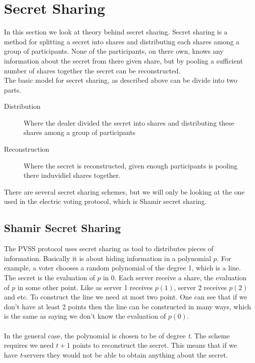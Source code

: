 \section{Secret Sharing}
In this section we look at theory behind secret sharing. Secret sharing is a method for splitting a secret into shares and distributing each shares among a group of participants. None of the participants, on there own, knows any information about the secret from there given share, but by pooling a sufficient number of shares together the secret can be reconstructed. \\

\noindent
The basic model for secret sharing, as described above can be divide into two parts. 

\begin{description}
    \item[Distribution] Where the dealer divided the secret into shares and distributing these shares among a group of participants 
    \item[Reconstruction] Where the secret is reconstructed, given enough participants is pooling there induvidiel shares together. 
\end{description}

\noindent
There are several secret sharing schemes, but we will only be looking at the one used in the electric voting protocol, which is Shamir secret sharing.

\subsection{Shamir Secret Sharing}
The PVSS protocol uses secret sharing as tool to distributes pieces of information. Basically it is about hiding information in a polynomial \begin{math}p\end{math}. For example, a voter chooses a random polynomial of the degree 1, which is a line. The secret is the evaluation of $p$ in \begin{math}0\end{math}. Each server receive a share, the evaluation of  \begin{math}p\end{math} in some other point. Like as server  1 receives  \begin{math}p(1)\end{math}, server 2 receives \begin{math}p(2)\end{math} and etc. To construct the line we need at most two point. One can see that if we don’t have at least 2 points then the line can be constructed in many ways, which is the same as saying we don’t know the evaluation of \begin{math}p(0)\end{math}.\\ \\
In the general case, the polynomial is chosen to be of degree \textit{t}. The scheme requires we need 
 \begin{math}t+1\end{math} points to reconstruct the secret. This means that if we have \textit{t}-servers they would not be able to obtain anything about the secret. 

